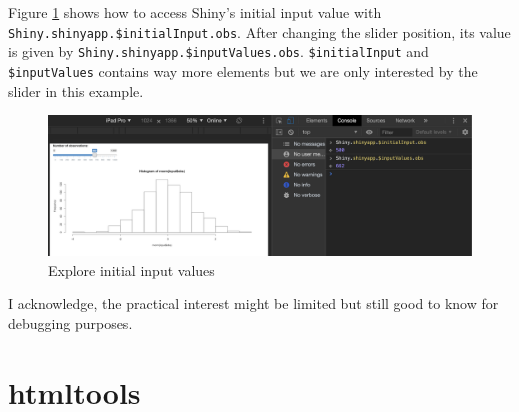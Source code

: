 \documentclass[]{book}
\newenvironment{Shaded}{\begin{snugshade}}{\end{snugshade}}
\newcommand{\ControlFlowTok}[1]{\textcolor[rgb]{0.13,0.29,0.53}{\textbf{#1}}}
\newcommand{\DataTypeTok}[1]{\textcolor[rgb]{0.13,0.29,0.53}{#1}}
\newcommand{\DecValTok}[1]{\textcolor[rgb]{0.00,0.00,0.81}{#1}}
\newcommand{\KeywordTok}[1]{\textcolor[rgb]{0.13,0.29,0.53}{\textbf{#1}}}
\newcommand{\NormalTok}[1]{#1}
\newcommand{\OperatorTok}[1]{\textcolor[rgb]{0.81,0.36,0.00}{\textbf{#1}}}
\newcommand{\StringTok}[1]{\textcolor[rgb]{0.31,0.60,0.02}{#1}}
\begin{document}
\begin{Shaded}
\end{Shaded}

Figure \ref{fig:shiny-initial-inputs} shows how to access Shiny's initial input value with \texttt{Shiny.shinyapp.\$initialInput.obs}. After changing the slider position, its value is given by \texttt{Shiny.shinyapp.\$inputValues.obs}. \texttt{\$initialInput} and \texttt{\$inputValues} contains way more elements but we are only interested by the slider in this example.

\begin{figure}
\includegraphics[width=27.61in]{images/survival-kit/shiny-init-input} \caption{Explore initial input values}\label{fig:shiny-initial-inputs}
\end{figure}

I acknowledge, the practical interest might be limited but still good to know for debugging purposes.

\hypertarget{part-htmltools}{%
\part*{htmltools}\label{part-htmltools}}
\end{document}
